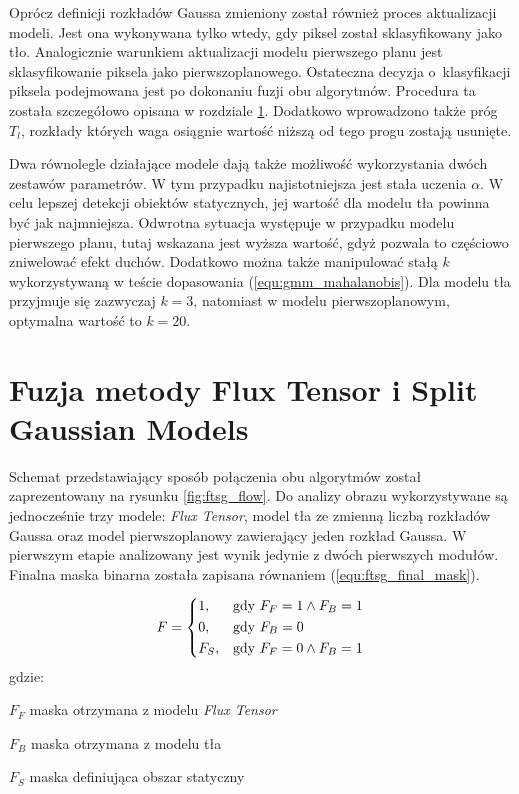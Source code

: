 Oprócz definicji rozkładów Gaussa zmieniony został również proces aktualizacji modeli. 
Jest ona wykonywana tylko wtedy, gdy piksel został sklasyfikowany jako tło. 
Analogicznie warunkiem aktualizacji modelu pierwszego planu jest sklasyfikowanie piksela jako pierwszoplanowego. 
Ostateczna decyzja o~klasyfikacji piksela podejmowana jest po dokonaniu fuzji obu algorytmów. 
Procedura ta została szczegółowo opisana w rozdziale \ref{sec:ftsg_fuzja}. 
Dodatkowo wprowadzono także próg $T_l$, rozkłady których waga osiągnie wartość niższą od tego progu zostają usunięte.

Dwa równolegle działające modele dają także możliwość wykorzystania dwóch zestawów parametrów. 
W tym przypadku najistotniejsza jest stała uczenia $\alpha$. 
W celu lepszej detekcji obiektów statycznych, jej wartość dla modelu tła powinna być jak najmniejsza. 
Odwrotna sytuacja występuje w przypadku modelu pierwszego planu, tutaj wskazana jest wyższa wartość, gdyż pozwala to częściowo zniwelować efekt duchów. 
Dodatkowo można także manipulować stałą $k$ wykorzystywaną w teście dopasowania (\ref{equ:gmm_mahalanobis}). 
Dla modelu tła przyjmuje się zazwyczaj $k=3$, natomiast w modelu pierwszoplanowym, optymalna wartość to $k=20$. 

\section{Fuzja metody Flux Tensor i Split Gaussian Models}
\label{sec:ftsg_fuzja}

Schemat przedstawiający sposób połączenia obu algorytmów został zaprezentowany na rysunku \ref{fig:ftsg_flow}. 
Do analizy obrazu wykorzystywane są jednocześnie trzy modele: \textit{Flux Tensor}, model tła ze zmienną liczbą rozkładów Gaussa oraz model pierwszoplanowy zawierający jeden rozkład Gaussa. 
W pierwszym etapie analizowany jest wynik jedynie z dwóch pierwszych modułów. Finalna maska binarna została zapisana równaniem (\ref{equ:ftsg_final_mask}).

\begin{equation}
    F= 
\begin{dcases}
    1,   & \text{gdy }  F_F = 1 \land F_B = 1\\
    0,   & \text{gdy }  F_B = 0\\ 
    F_S, & \text{gdy }  F_F = 0 \land F_B = 1\\
\end{dcases}
\label{equ:ftsg_final_mask}
\end{equation}
gdzie:
\begin{eqwhere}[2cm]
	\item [$F_F$] maska otrzymana z modelu \textit{Flux Tensor}
	\item [$F_B$] maska otrzymana z modelu tła
	\item [$F_S$] maska definiująca obszar statyczny \\
\end{eqwhere}

